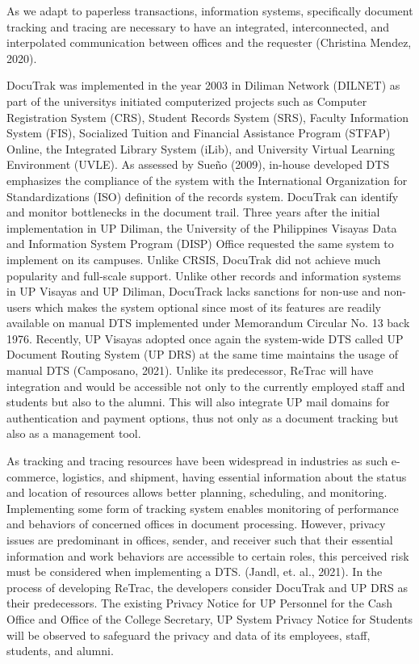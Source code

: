 As we adapt to paperless transactions, information systems, specifically document tracking and tracing are necessary to have an integrated, interconnected, and interpolated communication between offices and the requester (Christina Mendez, 2020). 

DocuTrak was implemented in the year 2003 in Diliman Network (DILNET) as part of the university\textsc{}s initiated computerized projects such as Computer Registration System (CRS), Student Records System (SRS), Faculty Information System (FIS), Socialized Tuition and Financial Assistance Program (STFAP) Online, the Integrated Library System (iLib), and University Virtual Learning Environment (UVLE). As assessed by Sueño (2009), in-house developed DTS emphasizes the compliance of the system with the International Organization for Standardizations (ISO) definition of the records system. DocuTrak can identify and monitor bottlenecks in the document trail. Three years after the initial implementation in UP Diliman, the University of the Philippines Visayas Data and Information System Program (DISP) Office requested the same system to implement on its campuses. Unlike CRSIS, DocuTrak did not achieve much popularity and full-scale support. Unlike other records and information systems in UP Visayas and UP Diliman, DocuTrack lacks sanctions for non-use and non-users which makes the system optional since most of its features are readily available on manual DTS  implemented under Memorandum Circular No. 13 back 1976. Recently, UP Visayas adopted once again the system-wide DTS called UP Document Routing System (UP DRS) at the same time maintains the usage of manual DTS (Camposano, 2021). Unlike its predecessor, ReTrac will have integration and would be accessible not only to the currently employed staff and students but also to the alumni. This will also integrate UP mail domains for authentication and payment options, thus not only as a document tracking but also as a management tool. 


As tracking and tracing resources have been widespread in industries as such e-commerce, logistics, and shipment, having essential information about the status and location of resources allows better planning, scheduling, and monitoring. Implementing some form of tracking system enables monitoring of performance and behaviors of concerned offices in document processing. However, privacy issues are predominant in offices, sender, and receiver such that their essential information and work behaviors are accessible to certain roles, this perceived risk must be considered when implementing a DTS. (Jandl, et. al., 2021). In the process of developing ReTrac, the developers consider DocuTrak and UP DRS as their predecessors. The existing Privacy Notice for UP Personnel for the Cash Office and Office of the College Secretary, UP System Privacy Notice for Students will be observed to safeguard the privacy and data of its employees, staff, students, and alumni.

